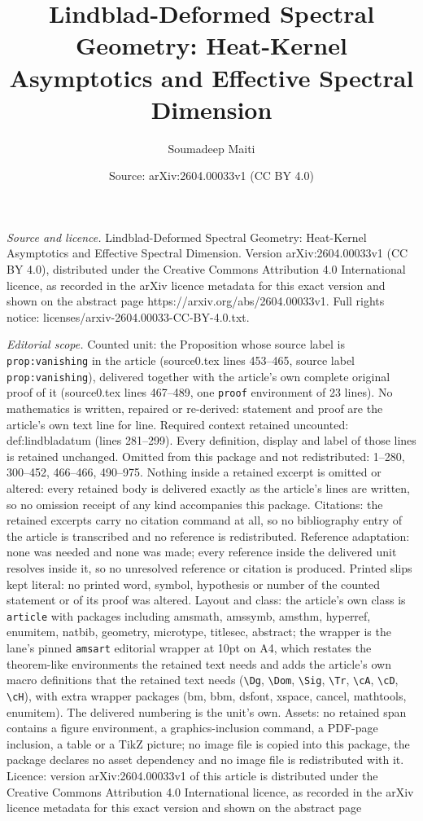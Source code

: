 \documentclass[10pt,a4paper]{amsart}
\title[Lindblad-Deformed Spectral Geometry: Heat-Kernel Asymptotics]{Lindblad-Deformed Spectral Geometry: Heat-Kernel Asymptotics and Effective Spectral Dimension}
\author{Soumadeep Maiti}
\date{Source: arXiv:2604.00033v1 (CC BY 4.0)}
\begin{document}
\maketitle

\noindent\emph{Source and licence.} Lindblad-Deformed Spectral Geometry: Heat-Kernel Asymptotics and Effective Spectral Dimension. Version arXiv:2604.00033v1 (CC BY 4.0), distributed under the Creative Commons Attribution 4.0 International licence, as recorded in the arXiv licence metadata for this exact version and shown on the abstract page https://arxiv.org/abs/2604.00033v1. Full rights notice: licenses/arxiv-2604.00033-CC-BY-4.0.txt.\par\smallskip

\noindent\textit{Editorial scope.} Counted unit: the Proposition whose source label is \texttt{prop:vanishing} in the article (source0.tex lines 453--465, source label \texttt{prop:vanishing}), delivered together with the article's own complete original proof of it (source0.tex lines 467--489, one \texttt{proof} environment of 23 lines). No mathematics is written, repaired or re-derived: statement and proof are the article's own text line for line. Required context retained uncounted: def:lindbladatum (lines 281--299). Every definition, display and label of those lines is retained unchanged. Omitted from this package and not redistributed: 1--280, 300--452, 466--466, 490--975. Nothing inside a retained excerpt is omitted or altered: every retained body is delivered exactly as the article's lines are written, so no omission receipt of any kind accompanies this package. Citations: the retained excerpts carry no citation command at all, so no bibliography entry of the article is transcribed and no reference is redistributed. Reference adaptation: none was needed and none was made; every reference inside the delivered unit resolves inside it, so no unresolved reference or citation is produced. Printed slips kept literal: no printed word, symbol, hypothesis or number of the counted statement or of its proof was altered. Layout and class: the article's own class is \texttt{article} with packages including amsmath, amssymb, amsthm, hyperref, enumitem, natbib, geometry, microtype, titlesec, abstract; the wrapper is the lane's pinned \texttt{amsart} editorial wrapper at 10pt on A4, which restates the theorem-like environments the retained text needs and adds the article's own macro definitions that the retained text needs (\texttt{\textbackslash Dg}, \texttt{\textbackslash Dom}, \texttt{\textbackslash Sig}, \texttt{\textbackslash Tr}, \texttt{\textbackslash cA}, \texttt{\textbackslash cD}, \texttt{\textbackslash cH}), with extra wrapper packages (bm, bbm, dsfont, xspace, cancel, mathtools, enumitem). The delivered numbering is the unit's own. Assets: no retained span contains a figure environment, a graphics-inclusion command, a PDF-page inclusion, a table or a TikZ picture; no image file is copied into this package, the package declares no asset dependency and no image file is redistributed with it. Licence: version arXiv:2604.00033v1 of this article is distributed under the Creative Commons Attribution 4.0 International licence, as recorded in the arXiv licence metadata for this exact version and shown on the abstract page 
\end{document}

